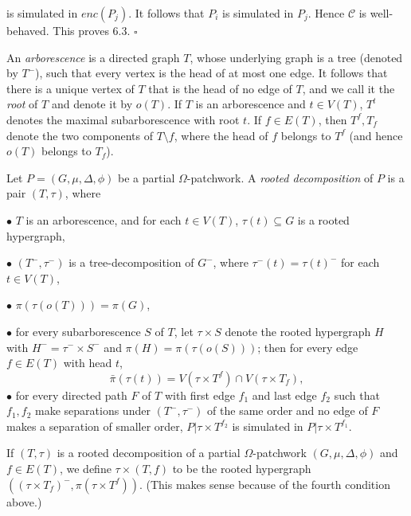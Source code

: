 \noindent is simulated in $enc(P_j)$. It follows that $P_i$ is simulated in $P_j$. Hence $\mathscr{C}$ is well-behaved. This proves 6.3. $\square$

An \textit{arborescence} is a directed graph $T$, whose underlying graph is a tree (denoted by $T^-$), such that every vertex is the head of at most one edge. It follows that there is a unique vertex of $T$ that is the head of no edge of $T$, and we call it the \textit{root} of $T$ and denote it by $o(T)$. If $T$ is an arborescence and $t \in V(T)$, $T^t$ denotes the maximal subarborescence with root $t$. If $f \in E(T)$, then $T^f, T_f$ denote the two components of $T \setminus f$, where the head of $f$ belongs to $T^f$ (and hence $o(T)$ belongs to $T_f$).

Let $P = (G, \mu, \Delta, \phi)$ be a partial $\Omega$-patchwork. A \textit{rooted decomposition} of $P$ is a pair $(T, \tau)$, where

\hspace*{12pt}$\bullet$ $T$ is an arborescence, and for each $t \in V(T)$, $\tau(t) \subseteq G$ is a rooted hypergraph,

\hspace*{12pt}$\bullet$ $(T^-, \tau^-)$ is a tree-decomposition of $G^-$, where $\tau^-(t) = \tau(t)^-$ for each $t \in V(T)$,

\hspace*{12pt}$\bullet$ $\pi(\tau(o(T))) = \pi(G)$,

\hspace*{12pt}$\bullet$ for every subarborescence $S$ of $T$, let $\tau \times S$ denote the rooted hypergraph $H$ with $H^- = \tau^- \times S^-$ and $\pi(H) = \pi(\tau(o(S)))$; then for every edge $f \in E(T)$ with head $t$,
\begin{equation*}
\bar{\pi}(\tau(t)) = V(\tau \times T^f) \cap V(\tau \times T_f),
\end{equation*}
\hspace*{12pt}$\bullet$ for every directed path $F$ of $T$ with first edge $f_1$ and last edge $f_2$ such that $f_1, f_2$ make separations under $(T^-, \tau^-)$ of the same order and no edge of $F$ makes a separation of smaller order, $P|\tau \times T^{f_2}$ is simulated in $P|\tau \times T^{f_1}$.

If $(T, \tau)$ is a rooted decomposition of a partial $\Omega$-patchwork $(G, \mu, \Delta, \phi)$ and $f \in E(T)$, we define $\tau \times (T, f)$ to be the rooted hypergraph $((\tau \times T_f)^-, \pi(\tau \times T^f))$. (This makes sense because of the fourth condition above.)


